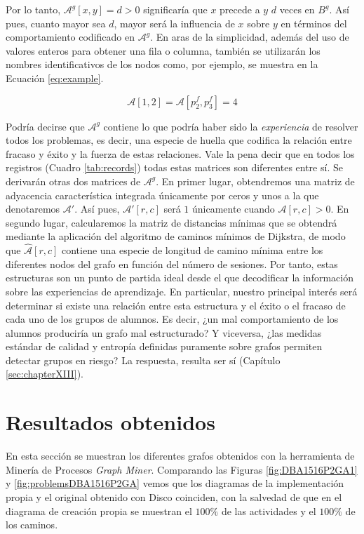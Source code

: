 Por lo tanto, $\mathcal{A}^g[x,y] = d > 0$ significaría que $x$ precede a $y$ $d$ veces en $B^g$. Así pues, cuanto mayor sea $d$, mayor será la influencia de $x$ sobre $y$ en términos del comportamiento codificado en $\mathcal{A}^g$. En aras de la simplicidad, además del uso de valores enteros para obtener una fila o columna, también se utilizarán los nombres identificativos de los nodos como, por ejemplo, se muestra en la Ecuación \ref{eq:example}.

\begin{equation}\label{eq:example}
\mathcal{A}[1,2] = \mathcal{A}[p_2^f,p_3^f] = 4
\end{equation}

Podría decirse que $\mathcal{A}^g$ contiene lo que podría haber sido la \emph{experiencia} de resolver todos los problemas, es decir, una especie de huella que codifica la relación entre fracaso y éxito y la fuerza de estas relaciones. Vale la pena decir que en todos los registros (Cuadro \ref{tab:records}) todas estas matrices son diferentes entre sí. Se derivarán otras dos matrices de $\mathcal{A}^g$. En primer lugar, obtendremos una matriz de adyacencia característica integrada únicamente por ceros y unos a la que denotaremos $\mathcal{A}'$. Así pues, $\mathcal{A}'[r, c]$ será $1$ únicamente cuando $\mathcal{A}[r, c] > 0$. En segundo lugar, calcularemos la matriz de distancias mínimas que se obtendrá mediante la aplicación del algoritmo de caminos mínimos de Dijkstra, de modo que $\hat{\mathcal{A}}[r, c]$ contiene una especie de longitud de camino mínima entre los diferentes nodos del grafo en función del número de sesiones. Por tanto, estas estructuras son un punto de partida ideal desde el que decodificar la información sobre las experiencias de aprendizaje. En particular, nuestro principal interés será determinar si existe una relación entre esta estructura y el éxito o el fracaso de cada uno de los grupos de alumnos. Es decir, ¿un mal comportamiento de los alumnos produciría un grafo mal estructurado? Y viceversa, ¿las medidas estándar de calidad y entropía definidas puramente sobre grafos permiten detectar grupos en riesgo? La respuesta, resulta ser sí (Capítulo \ref{sec:chapterXIII}).

\section{Resultados obtenidos}

En esta sección se muestran los diferentes grafos obtenidos con la herramienta de Minería de Procesos \emph{Graph Miner}. Comparando las Figuras \ref{fig:DBA1516P2GA1} y \ref{fig:problemsDBA1516P2GA} vemos que los diagramas de la implementación propia y el original obtenido con Disco coinciden, con la salvedad de que en el diagrama de creación propia se muestran el $100\%$ de las actividades y el $100\%$ de los caminos.

